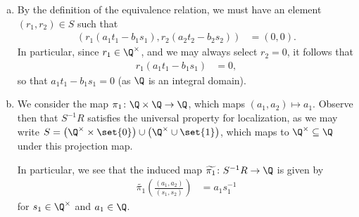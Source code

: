 \documentclass[10pt]{mypackage}
\begin{document}
\begin{solution}\hfill
  \begin{enumerate}[(a)]
    \item By the definition of the equivalence relation, we must have an element $\left( r_1,r_2 \right)\in S$ such that
      \begin{align*}
        \left( r_1\left( a_1t_1-b_1s_1 \right),r_2\left( a_2t_2-b_2s_2 \right) \right) &= \left( 0,0 \right).
      \end{align*}
      In particular, since $r_1\in \Q^{\times}$, and we may always select $r_2 = 0$, it follows that
      \begin{align*}
        r_1\left( a_1t_1-b_1s_1 \right) &= 0,
      \end{align*}
      so that $a_1t_1 - b_1s_1 = 0$ (as $\Q$ is an integral domain).
    \item We consider the map $\pi_1\colon \Q\times \Q\rightarrow \Q$, which maps $\left( a_1,a_2 \right)\mapsto a_1$. Observe then that $S^{-1}R$ satisfies the universal property for localization, as we may write $S = \left( \Q^{\times}\times \set{0} \right)\cup \left( \Q^{\times}\cup \set{1} \right)$, which maps to $\Q^{\times}\subseteq \Q$ under this projection map.\newline

      In particular, we see that the induced map $\widetilde{\pi_1}\colon S^{-1}R\rightarrow \Q$ is given by
      \begin{align*}
        \widetilde{\pi_1} \left( \frac{\left( a_1,a_2 \right)}{\left( s_1,s_2 \right)} \right) &= a_1s_1^{-1}
      \end{align*}
      for $s_1\in \Q^{\times}$ and $a_1\in \Q$.\newline


\end{enumerate}
\end{solution}
\end{document}
